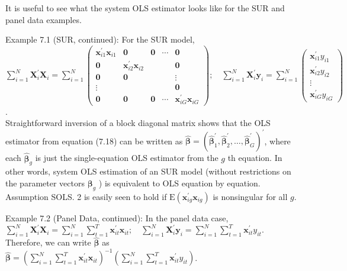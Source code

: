 \documentclass[10pt]{article}
\begin{document}
It is useful to see what the system OLS estimator looks like for the SUR and panel data examples.

Example 7.1 (SUR, continued): For the SUR model,\\
$\sum_{i=1}^{N} \mathbf{X}_{i}^{\prime} \mathbf{X}_{i}=\sum_{i=1}^{N}\left(\begin{array}{ccccc}\mathbf{x}_{i 1}^{\prime} \mathbf{x}_{i 1} & \mathbf{0} & \mathbf{0} & \cdots & \mathbf{0} \\ \mathbf{0} & \mathbf{x}_{i 2}^{\prime} \mathbf{x}_{i 2} & & & \mathbf{0} \\ \mathbf{0} & \mathbf{0} & & & \vdots \\ \vdots & & & & \mathbf{0} \\ \mathbf{0} & \mathbf{0} & \mathbf{0} & \cdots & \mathbf{x}_{i G}^{\prime} \mathbf{x}_{i G}\end{array}\right) ; \quad \sum_{i=1}^{N} \mathbf{X}_{i}^{\prime} \mathbf{y}_{i}=\sum_{i=1}^{N}\left(\begin{array}{c}\mathbf{x}_{i 1}^{\prime} y_{i 1} \\ \mathbf{x}_{i 2}^{\prime} y_{i 2} \\ \vdots \\ \mathbf{x}_{i G}^{\prime} y_{i G}\end{array}\right)$.\\
Straightforward inversion of a block diagonal matrix shows that the OLS estimator from equation (7.18) can be written as $\hat{\boldsymbol{\beta}}=\left(\hat{\boldsymbol{\beta}}_{1}^{\prime}, \hat{\boldsymbol{\beta}}_{2}^{\prime}, \ldots, \hat{\boldsymbol{\beta}}_{G}^{\prime}\right)^{\prime}$, where each $\hat{\boldsymbol{\beta}}_{g}$ is just the single-equation OLS estimator from the $g$ th equation. In other words, system OLS estimation of an SUR model (without restrictions on the parameter vectors $\boldsymbol{\beta}_{g}$ ) is equivalent to OLS equation by equation. Assumption SOLS. 2 is easily seen to hold if $\mathrm{E}\left(\mathbf{x}_{i g}^{\prime} \mathbf{x}_{i g}\right)$ is nonsingular for all $g$.

Example 7.2 (Panel Data, continued): In the panel data case,\\
$\sum_{i=1}^{N} \mathbf{X}_{i}^{\prime} \mathbf{X}_{i}=\sum_{i=1}^{N} \sum_{t=1}^{T} \mathbf{x}_{i t}^{\prime} \mathbf{x}_{i t} ; \quad \sum_{i=1}^{N} \mathbf{X}_{i}^{\prime} \mathbf{y}_{i}=\sum_{i=1}^{N} \sum_{t=1}^{T} \mathbf{x}_{i t}^{\prime} y_{i t}$.\\
Therefore, we can write $\hat{\boldsymbol{\beta}}$ as\\
$\hat{\boldsymbol{\beta}}=\left(\sum_{i=1}^{N} \sum_{t=1}^{T} \mathbf{x}_{i t}^{\prime} \mathbf{x}_{i t}\right)^{-1}\left(\sum_{i=1}^{N} \sum_{t=1}^{T} \mathbf{x}_{i t}^{\prime} y_{i t}\right)$.
\end{document}
